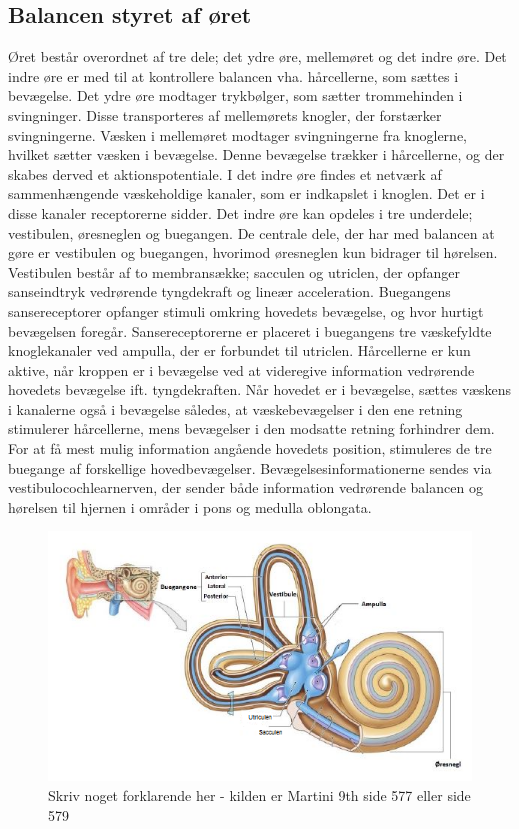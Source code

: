 \subsection{Balancen styret af øret}
Øret består overordnet af tre dele; det ydre øre, mellemøret og det indre øre. Det indre øre er med til at kontrollere balancen vha. hårcellerne, som sættes i bevægelse. Det ydre øre modtager trykbølger, som sætter trommehinden i svingninger. Disse transporteres af mellemørets knogler, der forstærker svingningerne. Væsken i mellemøret modtager svingningerne fra knoglerne, hvilket sætter væsken i bevægelse. Denne bevægelse trækker i hårcellerne, og der skabes derved et aktionspotentiale. I det indre øre findes et netværk af sammenhængende væskeholdige kanaler, som er indkapslet i knoglen. Det er i disse kanaler receptorerne sidder. Det indre øre kan opdeles i tre underdele; vestibulen, øresneglen og buegangen. De centrale dele, der har med balancen at gøre er vestibulen og buegangen, hvorimod øresneglen kun bidrager til hørelsen.\cite{Martini2012}    
\\
Vestibulen består af to membransække; sacculen og utriclen, der opfanger sanseindtryk vedrørende tyngdekraft og lineær acceleration. Buegangens sansereceptorer opfanger stimuli omkring hovedets bevægelse, og hvor hurtigt bevægelsen foregår. Sansereceptorerne er placeret i buegangens tre væskefyldte knoglekanaler ved ampulla, der er forbundet til utriclen. Hårcellerne er kun aktive, når kroppen er i bevægelse ved at videregive information vedrørende hovedets bevægelse ift. tyngdekraften. Når hovedet er i bevægelse, sættes væskens i kanalerne også i bevægelse således, at væskebevægelser i den ene retning stimulerer hårcellerne, mens bevægelser i den modsatte retning forhindrer dem. For at få mest mulig information angående hovedets position, stimuleres de tre buegange af forskellige hovedbevægelser. Bevægelsesinformationerne sendes via vestibulocochlearnerven, der sender både information vedrørende balancen og hørelsen til hjernen i områder i pons og medulla oblongata. \cite{Martini2012}    

\begin{figure}[H]
	\centering
	\includegraphics[scale=0.8]{figures/bProblemanalyse/Oerets-anatomi.png}
	\caption{Skriv noget forklarende her - kilden er Martini 9th side 577 eller side 579}
	\label{Oeret}
\end{figure}

